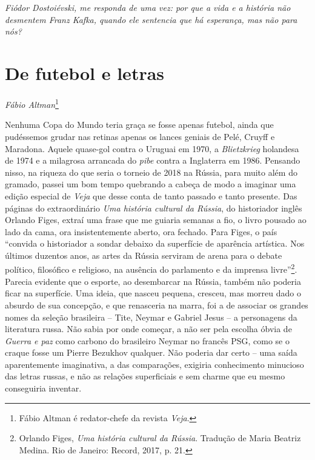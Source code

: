 \chapter*{}

\vfill
\begin{center}
\emph{Fiódor Dostoiévski, me responda de uma vez: por que a vida e a história não desmentem Franz Kafka, quando ele sentencia que há esperança, mas não para nós?}
\end{center}
\thispagestyle{empty}

\chapter*{De futebol e letras}

\begin{flushright}
\emph{Fábio Altman}\footnote{{Fábio Altman} é redator-chefe da revista \emph{Veja}.}
\end{flushright}

Nenhuma Copa do Mundo teria graça se fosse apenas futebol, ainda que
pudéssemos grudar nas retinas apenas os lances geniais de Pelé, Cruyff e
Maradona. Aquele quase-gol contra o Uruguai em 1970, a
\emph{Blietzkrieg} holandesa de 1974 e a milagrosa arrancada do
\emph{pibe} contra a Inglaterra em 1986. Pensando nisso, na riqueza do
que seria o torneio de 2018 na Rússia, para muito além do gramado,
passei um bom tempo quebrando a cabeça de modo a imaginar uma edição
especial de \emph{Veja} que desse conta de tanto passado e tanto
presente. Das páginas do extraordinário \emph{Uma história cultural da
Rússia}, do historiador inglês Orlando Figes, extraí uma frase que me
guiaria semanas a fio, o livro pousado ao lado da cama, ora
insistentemente aberto, ora fechado. Para Figes, o país ``convida o
historiador a sondar debaixo da superfície de aparência artística. Nos
últimos duzentos anos, as artes da Rússia serviram de arena para o
debate político, filosófico e religioso, na ausência do parlamento e da
imprensa livre''\footnote{Orlando Figes, \emph{Uma história cultural da
  Rússia}. Tradução de Maria Beatriz Medina. Rio de Janeiro: Record,
  2017, p. 21.}. Parecia evidente que o esporte, ao desembarcar na
Rússia, também não poderia ficar na superfície. Uma ideia, que nasceu
pequena, cresceu, mas morreu dado o absurdo de sua concepção, e que
renasceria na marra, foi a de associar os grandes nomes da seleção
brasileira -- Tite, Neymar e Gabriel Jesus -- a personagens da
literatura russa. Não sabia por onde começar, a não ser pela escolha
óbvia de \emph{Guerra e paz} como carbono do brasileiro Neymar no
francês PSG, como se o craque fosse um Pierre Bezukhov qualquer. Não
poderia dar certo -- uma saída aparentemente imaginativa, a das
comparações, exigiria conhecimento minucioso das letras russas, e não as
relações superficiais e sem charme que eu mesmo conseguiria inventar.

